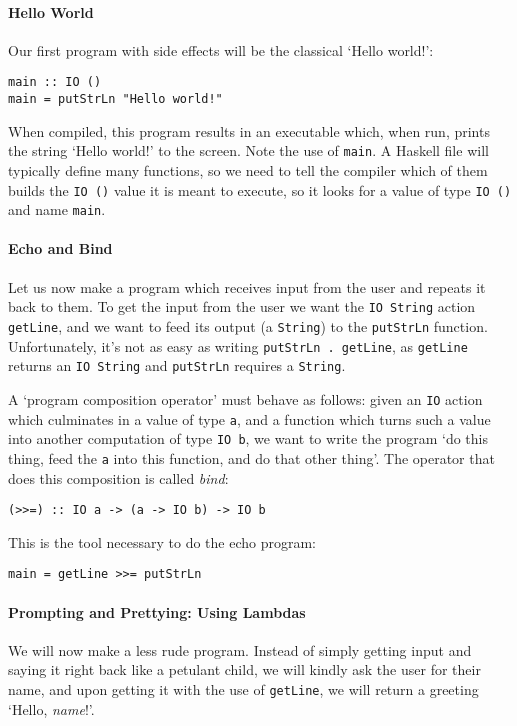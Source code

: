 \documentclass[11pt]{article}
\theoremstyle{nonumberplain}
\newcommand*\lsin{\lstinline}
\begin{document}
\paragraph{Hello World}
Our first program with side effects will be the classical `Hello world!':
\begin{lstlisting}
main :: IO ()
main = putStrLn "Hello world!"
\end{lstlisting}

When compiled, this program results in an executable which, when run, prints the string `Hello world!' to the screen. Note the use of \lsin|main|. A Haskell file will typically define many functions, so we need to tell the compiler which of them builds the \lsin|IO ()| value it is meant to execute, so it looks for a value of type \lsin|IO ()| and name \lsin|main|.

\paragraph{Echo and Bind}
Let us now make a program which receives input from the user and repeats it back to them. To get the input from the user we want the \mbox{\lsin|IO String|} action \lsin|getLine|, and we want to feed its output (a \lsin|String|) to the \lsin|putStrLn| function. Unfortunately, it's not as easy as writing \lsin|putStrLn . getLine|, as \lsin|getLine| returns an \lsin|IO String| and \lsin|putStrLn| requires a \lsin|String|.

A `program composition operator' must behave as follows: given an \lsin|IO| action which culminates in a value of type \lsin|a|, and a function which turns such a value into another computation of type \lsin|IO b|, we want to write the program `do this thing, feed the \lsin|a| into this function, and do that other thing'. The operator that does this composition is called \emph{bind}:
\begin{lstlisting}
(>>=) :: IO a -> (a -> IO b) -> IO b
\end{lstlisting}

This is the tool necessary to do the echo program:
\begin{lstlisting}
main = getLine >>= putStrLn
\end{lstlisting}

\paragraph{Prompting and Prettying: Using Lambdas}

We will now make a less rude program. Instead of simply getting input and saying it right back like a petulant child, we will kindly ask the user for their name, and upon getting it with the use of \lsin|getLine|, we will return a greeting `Hello, \textit{name}!'.
\end{document}
